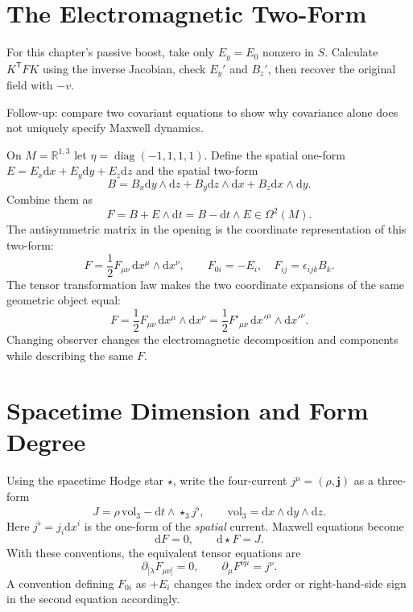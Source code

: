 \documentclass[11pt,openany]{book}
\numberwithin{equation}{chapter}
\theoremstyle{definition}
\theoremstyle{remark}
\newcommand{\dd}{\mathrm d}
\newcommand{\RR}{\mathbb R}
\newcommand{\vol}{\mathrm{vol}}
\newcommand{\starS}{\star_3}
\begin{document}
\section{The Electromagnetic Two-Form}
\begin{askai}
For this chapter's passive boost, take only $E_y=E_0$ nonzero in $S$.
Calculate $K^{\mathsf T}FK$ using the inverse Jacobian, check $E_y'$ and $B_z'$,
then recover the original field with $-v$.

Follow-up: compare two covariant equations to show why covariance alone does not uniquely specify Maxwell dynamics.
\end{askai}
On $M=\RR^{1,3}$ let $\eta=\operatorname{diag}(-1,1,1,1)$. Define the spatial one-form $E=E_x\dd x+E_y\dd y+E_z\dd z$ and the spatial two-form
\begin{equation}
B=B_x\dd y\wedge\dd z+B_y\dd z\wedge\dd x+B_z\dd x\wedge\dd y.
\end{equation}
Combine them as
\begin{equation}\label{eq:defF}
\boxed{F=B+E\wedge\dd t=B-\dd t\wedge E\in\Omega^2(M).}
\end{equation}
The antisymmetric matrix in the opening is the coordinate representation of this two-form:
\begin{equation}
F=\frac12F_{\mu\nu}\,\dd x^\mu\wedge\dd x^\nu,\qquad
F_{0i}=-E_i,\quad F_{ij}=\epsilon_{ijk}B_k.
\end{equation}
The tensor transformation law makes the two coordinate expansions of the same geometric object equal:
\begin{equation}
F=\frac12F_{\mu\nu}\,\dd x^\mu\wedge\dd x^\nu
=\frac12F'_{\mu\nu}\,\dd x'^\mu\wedge\dd x'^\nu.
\end{equation}
Changing observer changes the electromagnetic decomposition and components while describing the same $F$.

\section{Spacetime Dimension and Form Degree}
Using the spacetime Hodge star $\star$, write the four-current $j^\mu=(\rho,\bm j)$ as a three-form
\begin{equation}\label{eq:defJ}
J=\rho\,\vol_3-\dd t\wedge\starS j^\flat,
\qquad \vol_3=\dd x\wedge\dd y\wedge\dd z.
\end{equation}
Here $j^\flat=j_i\dd x^i$ is the one-form of the \emph{spatial} current. Maxwell equations become
\begin{equation}\label{eq:4maxwell}
\boxed{\dd F=0,\qquad \dd\star F=J.}
\end{equation}
With these conventions, the equivalent tensor equations are
\begin{equation}
\partial_{[\lambda}F_{\mu\nu]}=0,
\qquad \partial_\mu F^{\nu\mu}=j^\nu.
\end{equation}
A convention defining $F_{0i}$ as $+E_i$ changes the index order or right-hand-side sign in the second equation accordingly.
\end{document}
